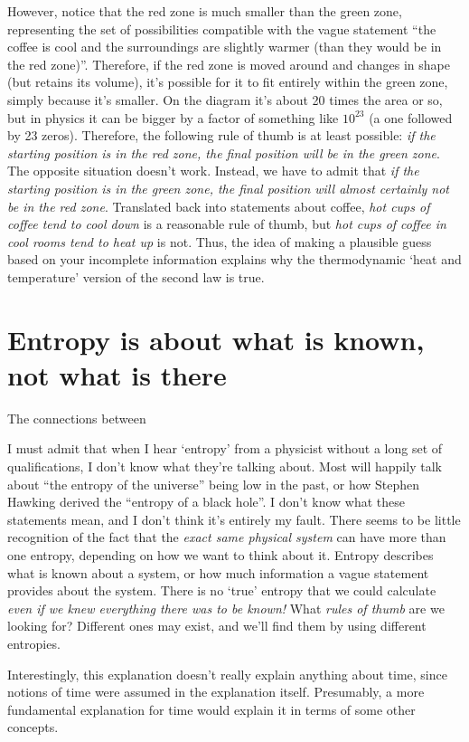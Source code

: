 \documentclass[a4paper, 12pt]{article}
\begin{document}
However, notice that the red zone is much smaller than the green zone,
representing the set of possibilities compatible with the vague statement
``the coffee is cool and the surroundings are slightly warmer (than they
would be in the red zone)''. Therefore, if the red zone is moved around and
changes in shape (but retains its volume), it's possible for it to fit entirely
within the green zone, simply because it's smaller.
On the diagram it's about 20 times the area or so,
but in physics it can be bigger by a factor of something like $10^{23}$
(a one followed by 23 zeros). Therefore, the following rule of thumb is at least
possible: {\em if the starting position is in the red zone, the final position
will be in the green zone}. The opposite situation doesn't work. Instead, we
have to admit that
{\em if the starting position is in the green zone, the final position will
almost certainly not be in the red zone}. Translated back into statements about
coffee, {\em hot cups of coffee tend to cool down} is a reasonable rule of
thumb, but {\em hot cups of coffee in cool rooms tend to heat up} is not.
Thus, the idea of making a plausible guess based on your incomplete information
explains why the thermodynamic `heat and temperature' version of the
second law is true.

\section*{Entropy is about what is known, not what is there}

The connections between 

I must admit that when I hear `entropy' from a physicist without a long
set of qualifications, I don't know what they're talking about. Most will
happily talk about ``the entropy of the universe'' being low in the past,
or how Stephen Hawking derived the ``entropy of a black hole''.
I don't know what these statements mean,
and I don't think it's entirely my fault.
There seems to be little recognition of the fact
that the {\em exact same physical system}
can have more than one entropy, depending on how we want to think about it.
Entropy describes what is known about a system, or how much information a
vague statement provides about the system. There is no `true' entropy that
we could calculate {\em even if we knew everything there was to be known!}
What {\em rules of thumb} are we looking for? Different ones may exist, and
we'll find them by using different entropies.

Interestingly, this explanation doesn't really explain anything about time,
since notions of time were assumed in the explanation itself. Presumably,
a more fundamental explanation for time would explain it in terms of some
other concepts.
\end{document}
